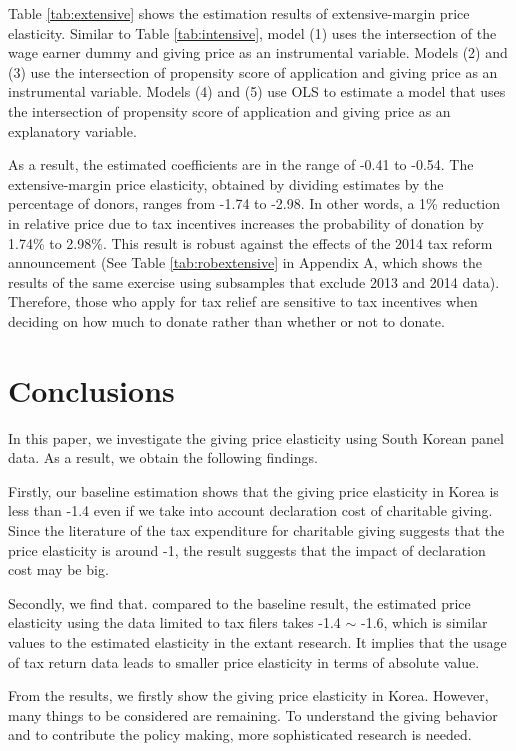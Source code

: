 \documentclass[
  11pt,
  a4paper,
]{article}
\begin{document}
Table \ref{tab:extensive} shows
the estimation results of extensive-margin price elasticity.
Similar to Table \ref{tab:intensive},
model (1) uses the intersection of the wage earner dummy and
giving price as an instrumental variable.
Models (2) and (3) use the intersection of propensity score of application
and giving price as an instrumental variable.
Models (4) and (5) use OLS to estimate a model that
uses the intersection of propensity score of application and
giving price as an explanatory variable.

As a result, the estimated coefficients are in the range of -0.41 to -0.54.
The extensive-margin price elasticity,
obtained by dividing estimates by the percentage of donors,
ranges from -1.74 to -2.98.
In other words,
a 1\% reduction in relative price due to tax incentives increases
the probability of donation by 1.74\% to 2.98\%.
This result is robust against
the effects of the 2014 tax reform announcement
(See Table \ref{tab:robextensive} in Appendix A,
which shows the results of the same exercise
using subsamples that exclude 2013 and 2014 data).
Therefore,
those who apply for tax relief are sensitive to tax incentives
when deciding on how much to donate rather than whether or not to donate.

\hypertarget{conclusions}{%
\section{Conclusions}\label{conclusions}}

In this paper, we investigate the giving price elasticity using South Korean panel data. As a result, we obtain the following findings.

Firstly, our baseline estimation shows that the giving price elasticity in Korea is less than -1.4 even if we take into account declaration cost of charitable giving. Since the literature of the tax expenditure for charitable giving suggests that the price elasticity is around -1, the result suggests that the impact of declaration cost may be big.

Secondly, we find that. compared to the baseline result, the estimated price elasticity using the data limited to tax filers takes -1.4 \(\sim\) -1.6, which is similar values to the estimated elasticity in the extant research. It implies that the usage of tax return data leads to smaller price elasticity in terms of absolute value.

From the results, we firstly show the giving price elasticity in Korea. However, many things to be considered are remaining. To understand the giving behavior and to contribute the policy making, more sophisticated research is needed.
\end{document}
